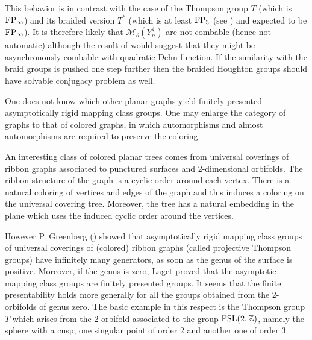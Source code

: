 \documentclass[twoside]{irmaems}
\theoremstyle{plain}
\theoremstyle{definition}
\theoremstyle{remark}
\newcommand{\Z}{{\mathbb{Z}}}
\begin{document}
\vspace{0.2cm}
\noindent
This behavior  is in contrast with the case of the Thompson group $T$ (which is ${\rm FP}_{\infty}$) and its braided version $T^*$ (which is at least ${\rm FP}_3$ (see \cite{fu-ka4}) 
and expected to be ${\rm FP}_{\infty}$).  It is therefore likely that 
${\mathcal M}_{\partial}(Y_n^{\sharp})$ are not combable 
(hence not automatic) although the result of \cite{fu-ka4} would suggest 
that they might be asynchronously combable with quadratic Dehn function. 
If the similarity with the braid groups is pushed one step further 
then the braided Houghton groups should have solvable 
conjugacy problem as well. 


\vspace{0.1cm}
\noindent
One does not know which other planar graphs yield 
finitely presented asymptotically rigid mapping class groups. 
One may enlarge 
the category of graphs to that of colored graphs, in which automorphisms 
and almost automorphisms are required to preserve the coloring. 

\vspace{0.1cm}
\noindent 
An interesting class of colored planar trees 
comes from universal coverings of ribbon graphs associated to punctured 
surfaces and 2-dimensional orbifolds. The ribbon structure of the graph 
is a cyclic order around each vertex. 
There is a natural coloring of 
vertices and edges of the graph  and this 
induces a coloring on the universal covering tree. Moreover, the tree 
has a natural embedding in the plane which uses the induced cyclic order   
around the vertices. 

\vspace{0.1cm}
\noindent 
However P. Greenberg (\cite{Gr}) 
showed that asymptotically rigid mapping class groups of universal coverings 
of (colored) ribbon graphs (called projective Thompson groups) 
have infinitely many  generators, as soon as the genus of the surface 
is positive. Moreover, if the genus is zero,  Laget \cite{L} proved that 
the asymptotic mapping class groups are finitely presented groups. 
It seems that the finite presentability holds more generally for 
all the groups obtained from the 2-orbifolds of genus zero. 
The basic example in this respect is the Thompson group $T$ which arises 
from the 2-orbifold associated to the group ${\rm PSL}(2,\Z)$, namely 
the sphere with a cusp, one singular point of order 2 and another one of 
order 3.   
\end{document}
